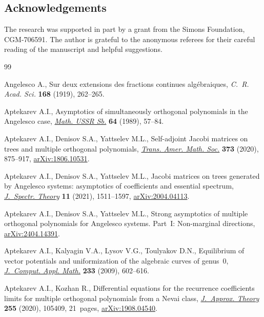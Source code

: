 \documentclass[10pt,a4paper]{amsart}
\numberwithin{equation}{section}
\begin{document}
\subsection*{Acknowledgements}

The research was supported in part by a grant from the Simons Foundation, CGM-706591. The author is grateful to the anonymous referees for their careful reading of the manuscript and helpful suggestions.


\begin{thebibliography}{99}
\footnotesize\itemsep=0pt

Angelesco A., Sur deux extensions des fractions continues alg\'ebraiques,
 \textit{C.~R. Acad. Sci.} \textbf{168} (1919), 262--265.

Aptekarev A.I., Asymptotics of simultaneously orthogonal polynomials in the
 {A}ngelesco case,
 \href{https://doi.org/10.1070/SM1989v064n01ABEH003294}{\textit{Math. USSR
 Sb.}} \textbf{64} (1989), 57--84.

Aptekarev A.I., Denisov S.A., Yattselev M.L., Self-adjoint {J}acobi matrices on
 trees and multiple orthogonal polynomials,
 \href{https://doi.org/10.1090/tran/7959}{\textit{Trans. Amer. Math. Soc.}}
 \textbf{373} (2020), 875--917, \href{http://arxiv.org/abs/1806.10531}{arXiv:1806.10531}.

Aptekarev A.I., Denisov S.A., Yattselev M.L., Jacobi matrices on trees
 generated by {A}ngelesco systems: asymptotics of coefficients and essential
 spectrum, \href{https://doi.org/10.4171/jst/380}{\textit{J.~Spectr. Theory}}
 \textbf{11} (2021), 1511--1597, \href{http://arxiv.org/abs/2004.04113}{arXiv:2004.04113}.

Aptekarev A.I., Denisov S.A., Yattselev M.L., Strong asymptotics of multiple
 orthogonal polynomials for {A}ngelesco systems. {P}art~{I}: {N}on-marginal
 directions, \href{http://arxiv.org/abs/2404.14391}{arXiv:2404.14391}.
 
Aptekarev A.I., Kalyagin V.A., Lysov V.G., Toulyakov D.N., Equilibrium of
 vector potentials and uniformization of the algebraic curves of genus~0,
 \href{https://doi.org/10.1016/j.cam.2009.02.080}{\textit{J.~Comput. Appl.
 Math.}} \textbf{233} (2009), 602--616.

Aptekarev A.I., Kozhan R., Differential equations for the recurrence
 coefficients limits for multiple orthogonal polynomials from a {N}evai class,
 \href{https://doi.org/10.1016/j.jat.2020.105409}{\textit{J.~Approx. Theory}}
 \textbf{255} (2020), 105409, 21~pages, \href{http://arxiv.org/abs/1908.04540}{arXiv:1908.04540}.


\end{thebibliography}
\end{document}
